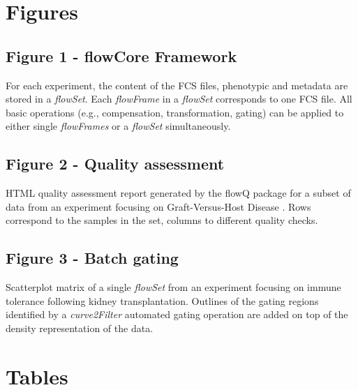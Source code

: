 \documentclass[10pt]{bmc_article}
\newcommand{\Rclass}[1]{{\textit{#1}}}
\newenvironment{bmcformat}{\begin{raggedright}\baselineskip20pt\sloppy\setboolean{publ}{false}}{\end{raggedright}\baselineskip20pt\sloppy}
\begin{document}
\begin{bmcformat}

\section*{Figures}
  \subsection*{Figure 1 - flowCore Framework}
 \label{fig1:FrameWork}For each experiment, the content of
        the FCS files, phenotypic and metadata are stored in a
        \Rclass{flowSet}. Each \Rclass{flowFrame} in a \Rclass{flowSet}
        corresponds to one FCS file. All basic operations (e.g.,
        compensation, transformation, gating) can be applied to either
        single \Rclass{flowFrames} or a \Rclass{flowSet} simultaneously.

  
  \subsection*{Figure 2 - Quality assessment}
    \label{flowQ}%
        HTML quality assessment report generated by the flowQ package for a
        subset of data from an experiment focusing on Graft-Versus-Host
        Disease \cite{brinkman2007hcf}. Rows correspond to the samples in
        the set, columns to different quality checks.


    \subsection*{Figure 3 - Batch gating}
    \label{xyplot}{ 
      Scatterplot matrix of a single \Rclass{flowSet}
      from an experiment focusing on immune tolerance following kidney
      transplantation. Outlines of the gating regions identified by a
      \Rclass{curve2Filter} automated gating operation are added on
      top of the density representation of the data.}


\section*{Tables}

\end{bmcformat}
\end{document}
